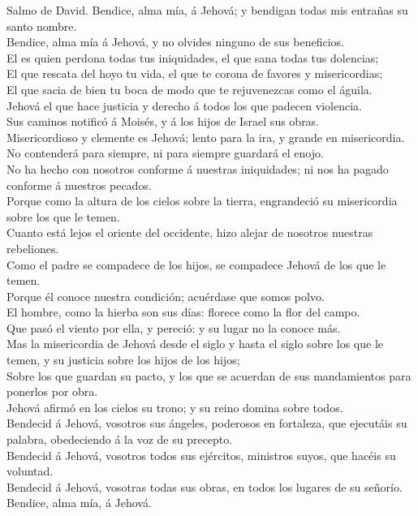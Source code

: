  Salmo de David. Bendice, alma mía, á Jehová; y bendigan
todas mis entrañas su santo nombre.\\
 Bendice, alma mía á Jehová, y no olvides ninguno de sus
beneficios.\\
 El es quien perdona todas tus iniquidades, el que sana
todas tus dolencias;\\
 El que rescata del hoyo tu vida, el que te corona de
favores y misericordias;\\
 El que sacia de bien tu boca de modo que te rejuvenezcas
como el águila.\\
 Jehová el que hace justicia y derecho á todos los que
padecen violencia.\\
 Sus caminos notificó á Moisés, y á los hijos de Israel
sus obras.\\
 Misericordioso y clemente es Jehová; lento para la ira, y
grande en misericordia.\\
 No contenderá para siempre, ni para siempre guardará el
enojo.\\
 No ha hecho con nosotros conforme á nuestras
iniquidades; ni nos ha pagado conforme á nuestros pecados.\\
 Porque como la altura de los cielos sobre la tierra,
engrandeció su misericordia sobre los que le temen.\\
 Cuanto está lejos el oriente del occidente, hizo alejar
de nosotros nuestras rebeliones.\\
 Como el padre se compadece de los hijos, se compadece
Jehová de los que le temen.\\
 Porque él conoce nuestra condición; acuérdase que somos
polvo.\\
 El hombre, como la hierba son sus días: florece como la
flor del campo.\\
 Que pasó el viento por ella, y pereció: y su lugar no la
conoce más.\\
 Mas la misericordia de Jehová desde el siglo y hasta el
siglo sobre los que le temen, y su justicia sobre los hijos de los
hijos;\\
 Sobre los que guardan su pacto, y los que se acuerdan de
sus mandamientos para ponerlos por obra.\\
 Jehová afirmó en los cielos su trono; y su reino domina
sobre todos.\\
 Bendecid á Jehová, vosotros sus ángeles, poderosos en
fortaleza, que ejecutáis su palabra, obedeciendo á la voz de su
precepto.\\
 Bendecid á Jehová, vosotros todos sus ejércitos,
ministros suyos, que hacéis su voluntad.\\
 Bendecid á Jehová, vosotras todas sus obras, en todos
los lugares de su señorío. Bendice, alma mía, á Jehová.

